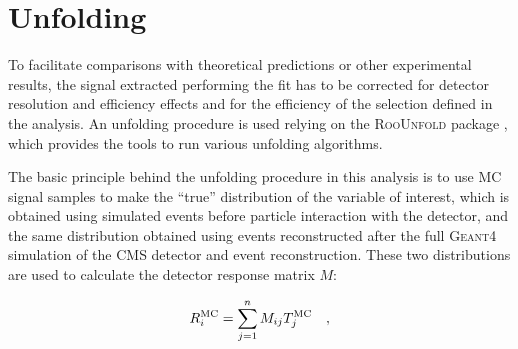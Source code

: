 \section{Unfolding}
\label{sec:Unfolding}

To facilitate comparisons with theoretical predictions or other experimental results, the signal
extracted performing the fit has to be corrected for detector resolution and
efficiency effects and for the efficiency of the selection defined in the
analysis.
An unfolding procedure is used relying on the \textsc{RooUnfold} package
\cite{Adye:2011gm}, which provides the tools to run various unfolding
algorithms.

The basic principle behind the unfolding procedure in this analysis is to use MC signal samples
to make the ``true'' distribution of the variable of interest, which is obtained using simulated events before particle interaction with the detector, and the same distribution obtained
using events reconstructed after the full \textsc{Geant4} simulation of the CMS detector
and event reconstruction. These two distributions are used to calculate the detector
response matrix $M$:

\begin{equation}\label{eq:resp_matrix}
R_{i}^{\rm {MC}} = \sum_{j=1}^{n} M_{ij}T_{j}^{\rm {MC}} \quad ,
\end{equation}

